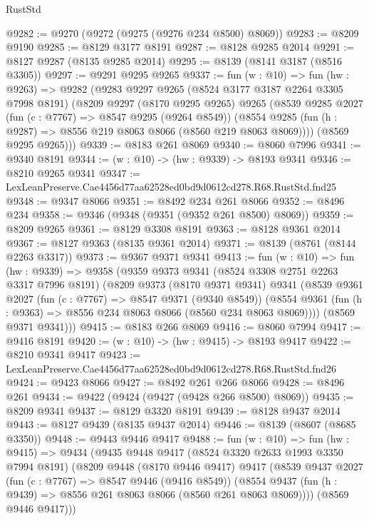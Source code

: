 \begin{lexlean}{RustStd}
\begin{coremodule}
@9282 := @9270 (@9272 (@9275 (@9276 @234 @8500) @8069))
@9283 := @8209 @9190
@9285 := @8129 @3177 @8191
@9287 := @8128 @9285 @2014
@9291 := @8127 @9287 (@8135 @9285 @2014)
@9295 := @8139 (@8141 @3187 (@8516 @3305))
@9297 := @9291 @9295 @9265
@9337 := fun (w : @10) =>
  fun (hw : @9263) =>
  @9282
    (@9283
      @9297
      @9265
      (@8524 @3177 @3187 @2264 @3305 @7998 @8191)
      (@8209
        @9297
        (@8170 @9295 @9265)
        @9265
        (@8539
          @9285
          @2027
          (fun (c : @7767) => @8547 @9295 (@9264 @8549))
          (@8554 @9285 (fun (h : @9287) => @8556 @219 @8063 @8066 (@8560 @219 @8063 @8069))))
        (@8569 @9295 @9265)))
@9339 := @8183 @261 @8069
@9340 := @8060 @7996
@9341 := @9340 @8191
@9344 := (w : @10) -> (hw : @9339) -> @8193 @9341
@9346 := @8210 @9265 @9341
@9347 := LexLeanPreserve.Cae4456d77aa62528ed0bd9d0612cd278.R68.RustStd.fnd25
@9348 := @9347 @8066
@9351 := @8492 @234 @261 @8066
@9352 := @8496 @234
@9358 := @9346 (@9348 (@9351 (@9352 @261 @8500) @8069))
@9359 := @8209 @9265
@9361 := @8129 @3308 @8191
@9363 := @8128 @9361 @2014
@9367 := @8127 @9363 (@8135 @9361 @2014)
@9371 := @8139 (@8761 (@8144 @2263 @3317))
@9373 := @9367 @9371 @9341
@9413 := fun (w : @10) =>
  fun (hw : @9339) =>
  @9358
    (@9359
      @9373
      @9341
      (@8524 @3308 @2751 @2263 @3317 @7996 @8191)
      (@8209
        @9373
        (@8170 @9371 @9341)
        @9341
        (@8539
          @9361
          @2027
          (fun (c : @7767) => @8547 @9371 (@9340 @8549))
          (@8554 @9361 (fun (h : @9363) => @8556 @234 @8063 @8066 (@8560 @234 @8063 @8069))))
        (@8569 @9371 @9341)))
@9415 := @8183 @266 @8069
@9416 := @8060 @7994
@9417 := @9416 @8191
@9420 := (w : @10) -> (hw : @9415) -> @8193 @9417
@9422 := @8210 @9341 @9417
@9423 := LexLeanPreserve.Cae4456d77aa62528ed0bd9d0612cd278.R68.RustStd.fnd26
@9424 := @9423 @8066
@9427 := @8492 @261 @266 @8066
@9428 := @8496 @261
@9434 := @9422 (@9424 (@9427 (@9428 @266 @8500) @8069))
@9435 := @8209 @9341
@9437 := @8129 @3320 @8191
@9439 := @8128 @9437 @2014
@9443 := @8127 @9439 (@8135 @9437 @2014)
@9446 := @8139 (@8607 (@8685 @3350))
@9448 := @9443 @9446 @9417
@9488 := fun (w : @10) =>
  fun (hw : @9415) =>
  @9434
    (@9435
      @9448
      @9417
      (@8524 @3320 @2633 @1993 @3350 @7994 @8191)
      (@8209
        @9448
        (@8170 @9446 @9417)
        @9417
        (@8539
          @9437
          @2027
          (fun (c : @7767) => @8547 @9446 (@9416 @8549))
          (@8554 @9437 (fun (h : @9439) => @8556 @261 @8063 @8066 (@8560 @261 @8063 @8069))))
        (@8569 @9446 @9417)))

\end{coremodule}
\end{lexlean}
